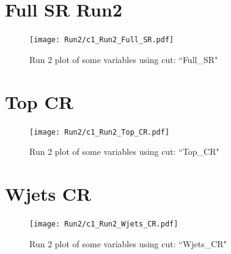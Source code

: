 \documentclass{article}
\begin{document}
    \section*{Full SR Run2}
    \begin{figure}[H]
        \centering
        \caption{Run 2 plot of some variables using cut: ``Full\_SR"}
        \texttt{[image: Run2/c1\_Run2\_Full\_SR.pdf]}
    \end{figure}
    \section*{Top CR}
    \begin{figure}[H]
        \centering
        \caption{Run 2 plot of some variables using cut: ``Top\_CR"}
        \texttt{[image: Run2/c1\_Run2\_Top\_CR.pdf]}
    \end{figure}  
    \section*{Wjets CR}
    \begin{figure}[H]
        \centering
        \caption{Run 2 plot of some variables using cut: ``Wjets\_CR"}
        \texttt{[image: Run2/c1\_Run2\_Wjets\_CR.pdf]}
    \end{figure}  
\end{document}
